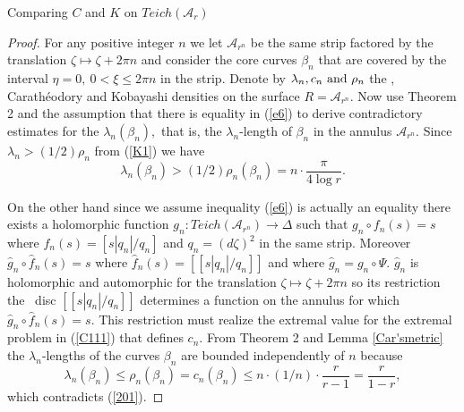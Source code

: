 \documentclass[12pt]{amsart}
\theoremstyle{remark}
\theoremstyle{definition}
\theoremstyle{definition}
\begin{document}
\begin{section}{Comparing $C$ and $K$ on $Teich({\mathcal A}_r)$}
\begin{proof}
      For any positive integer $n$ we let ${\mathcal A}_{r^n}$ be the same strip factored  by the translation 
      $\zeta \mapsto \zeta + 2 \pi n$ and consider the core curves $\beta_n$ that are covered 
      by the interval $\eta=0, \ 0 <\xi \leq 2 \pi n$ in the strip. Denote by $\lambda_n,c_n {\rm \ and \ } 
      \rho_n$ the \te, Carath\'eodory and Kobayashi densities on the surface $R={\mathcal A}_{r^n}.$
      Now use Theorem 2 and the assumption that there is equality in (\ref{e6}) to  derive 
      contradictory estimates for the $\lambda_n(\beta_n),$ that is, the $\lambda_n$-length of $\beta_n$ in 
      the annulus ${\mathcal A}_{r^n}.$
            Since $\lambda_n > (1/2)\rho_n$  from (\ref{K1}) we have 
      \begin{equation}\label{201}\lambda_n(\beta_n) > (1/2)\rho_n(\beta_n)= n \cdot \frac{\pi}{4 \log r}.
      \end{equation}
      
      On the other hand since we assume inequality (\ref{e6}) is actually an equality
      there exists a holomorphic function $g_n:Teich({\mathcal A}_{r^n}) \rightarrow \Delta$ such that
      $g_n \circ f_n(s)=s$ where $f_n(s) = [s|q_n|/q_n]$ and $q_n = (d \zeta)^2$ in the same strip.
      Moreover $\hat{g}_n \circ \hat{f}_n(s)=s$ where $\hat{f}_n(s)=[[s|q_n|/q_n]]$ and
      where $\hat{g}_n = g_n \circ \Psi.$
      $\hat{g}_n$ is holomorphic and automorphic for the translation $\zeta \mapsto \zeta + 2 \pi n$ so its restriction the \te\ disc $[[s|q_n|/q_n]]$ determines a function on the annulus for which $\hat{g}_n \circ \hat{f}_n (s)=s.$ This restriction must realize the extremal value for the extremal problem in (\ref{C111}) that defines $c_n.$  From Theorem 2 and Lemma \ref{Car'smetric}  the $\lambda_n$-lengths of the curves $\beta_n$ are bounded independently of $n$ because 
      $$\lambda_n(\beta_n) \leq \rho_n(\beta_n)=c_n(\beta_n) \leq n \cdot (1/n) \cdot \frac{r}{r-1}=\frac{r}{1-r}, 
      $$
      which contradicts (\ref{201}).
      
\end{proof}      
      
         
   
  \end{section}
\end{document}
